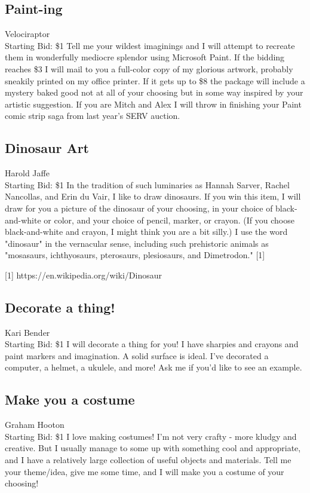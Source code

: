 \documentclass[11pt]{article}
\begin{document}
\subsection{Paint-ing}
Velociraptor
\\
Starting Bid: \$1
\newline
Tell me your wildest imaginings and I will attempt to recreate them in wonderfully mediocre splendor using Microsoft Paint.  If the bidding reaches \$3 I will mail to you a full-color copy of my glorious artwork, probably sneakily printed on my office printer.  If it gets up to \$8 the package will include a mystery baked good not at all of your choosing but in some way inspired by your artistic suggestion. If you are Mitch and Alex I will throw in finishing your Paint comic strip saga from last year's SERV auction.
\subsection{Dinosaur Art}
Harold Jaffe
\\
Starting Bid: \$1
\newline
In the tradition of such luminaries as Hannah Sarver, Rachel Nancollas, and Erin du Vair, I like to draw dinosaurs. If you win this item, I will draw for you a picture of the dinosaur of your choosing, in your choice of black-and-white or color, and your choice of pencil, marker, or crayon. (If you choose black-and-white and crayon, I might think you are a bit silly.) I use the word "dinosaur" in the vernacular sense, including such prehistoric animals as "mosasaurs, ichthyosaurs, pterosaurs, plesiosaurs, and Dimetrodon." [1]

[1] https://en.wikipedia.org/wiki/Dinosaur
\subsection{Decorate a thing!}
Kari Bender
\\
Starting Bid: \$1
\newline
I will decorate a thing for you! I have sharpies and crayons and paint markers and imagination. A solid surface is ideal. I've decorated a computer, a helmet, a ukulele, and more! Ask me if you'd like to see an example.
\subsection{Make you a costume}
Graham Hooton
\\
Starting Bid: \$1
\newline
I love making costumes! I'm not very crafty - more kludgy and creative. But I usually manage to some up with something cool and appropriate, and I have a relatively large collection of useful objects and materials. Tell me your theme/idea, give me some time, and I will make you a costume of your choosing!
\end{document}
